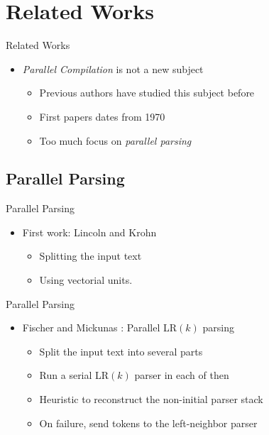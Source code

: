 \section{Related Works}

\begin{frame}{Related Works}
\begin{itemize}
    \item \textit{Parallel Compilation} is not a new subject
    \begin{itemize}
        \item Previous authors have studied this subject before
        \item First papers dates from 1970
        \item Too much focus on \textit{parallel parsing}
    \end{itemize}
\end{itemize}
\end{frame}

\subsection{Parallel Parsing}

\begin{frame}{Parallel Parsing}
\begin{itemize}
    \item First work: Lincoln \cite{Lincoln:1970:PPT:987475.987478} and Krohn \cite{Krohn:1975:PAC:390015.808414}
    \begin{itemize}
        \item Splitting the input text
        \item Using vectorial units.
    \end{itemize}
\end{itemize}
\end{frame}


\begin{frame}{Parallel Parsing}
\begin{itemize}
    \item Fischer \cite{fischer1975parsing} and Mickunas \cite{Mickunas:1978:PCM:800127.804105}: Parallel LR$(k)$ parsing
    \begin{itemize}
        \item Split the input text into several parts
        \item Run a serial LR$(k)$ parser in each of then
        \item Heuristic to reconstruct the non-initial parser stack
        \item On failure, send tokens to the left-neighbor parser
    \end{itemize}
\end{itemize}
\end{frame}

